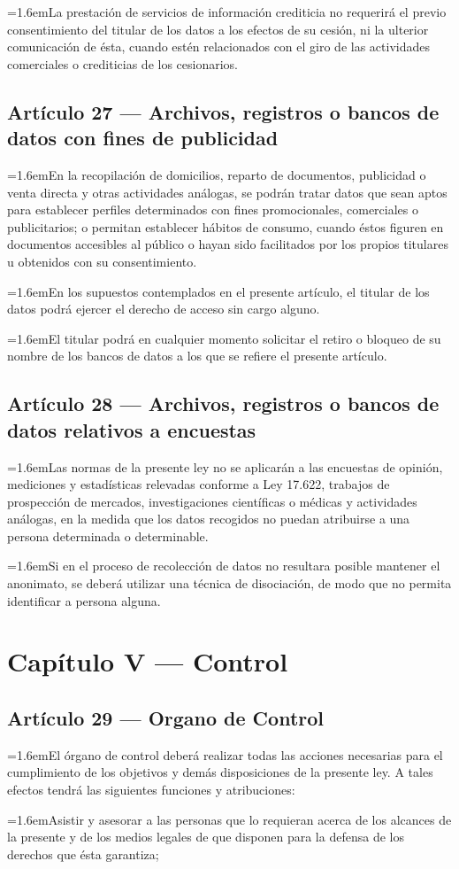 \documentclass[10pt,a4paper]{article}
\newcommand{\articulo}[1]{\subsection{#1}}
\newcommand{\inciso}[2]{\par{\hangindent=1.6em\hangafter=1\makebox[1.6em][l]{#1}#2\par}}
\begin{document}
\inciso{5.}{La prestación de servicios de información crediticia no requerirá el previo consentimiento del titular de los datos a los efectos de su cesión, ni la ulterior comunicación de ésta, cuando estén relacionados con el giro de las actividades comerciales o crediticias de los cesionarios.}

\articulo{Artículo 27 --- Archivos, registros o bancos de datos con fines de publicidad}
\inciso{1.}{En la recopilación de domicilios, reparto de documentos, publicidad o venta directa y otras actividades análogas, se podrán tratar datos que sean aptos para establecer perfiles determinados con fines promocionales, comerciales o publicitarios; o permitan establecer hábitos de consumo, cuando éstos figuren en documentos accesibles al público o hayan sido facilitados por los propios titulares u obtenidos con su consentimiento.}

\inciso{2.}{En los supuestos contemplados en el presente artículo, el titular de los datos podrá ejercer el derecho de acceso sin cargo alguno.}

\inciso{3.}{El titular podrá en cualquier momento solicitar el retiro o bloqueo de su nombre de los bancos de datos a los que se refiere el presente artículo.}

\articulo{Artículo 28 --- Archivos, registros o bancos de datos relativos a encuestas}
\inciso{1.}{Las normas de la presente ley no se aplicarán a las encuestas de opinión, mediciones y estadísticas relevadas conforme a Ley 17.622, trabajos de prospección de mercados, investigaciones científicas o médicas y actividades análogas, en la medida que los datos recogidos no puedan atribuirse a una persona determinada o determinable.}

\inciso{2.}{Si en el proceso de recolección de datos no resultara posible mantener el anonimato, se deberá utilizar una técnica de disociación, de modo que no permita identificar a persona alguna.}

\section{Capítulo V --- Control}
\articulo{Artículo 29 --- Organo de Control}
\inciso{1.}{El órgano de control deberá realizar todas las acciones necesarias para el cumplimiento de los objetivos y demás disposiciones de la presente ley. A tales efectos tendrá las siguientes funciones y atribuciones:}

\inciso{a)}{Asistir y asesorar a las personas que lo requieran acerca de los alcances de la presente y de los medios legales de que disponen para la defensa de los derechos que ésta garantiza;}
\end{document}
